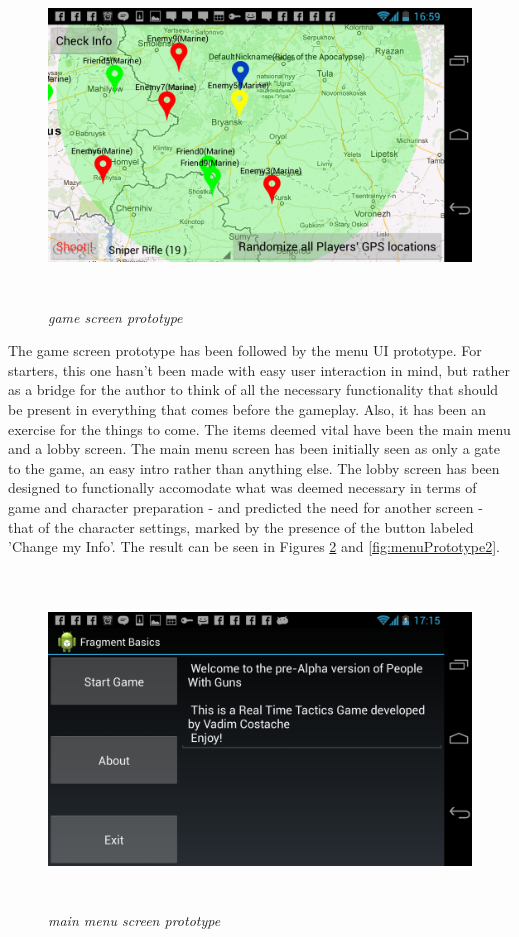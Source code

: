 \begin{figure}
\includegraphics[height=3.5in,width=6.23in]{./images/android_screenshots/ui_prototype/UI_prototype_5.png}  
\caption{\small \sl game screen prototype \label{fig:UIPrototype5}}
\end{figure}


The game screen prototype has been followed by the menu UI prototype. For
starters, this one hasn't been made with easy user interaction in mind, but
rather as a bridge for the author to think of all the necessary functionality
that should be present in everything that comes before the gameplay. Also, it
has been an exercise for the things to come. The items deemed vital have been
the main menu and a lobby screen. The main menu screen has been initially seen
as only a gate to the game, an easy intro rather than anything else. The lobby
screen has been designed to functionally accomodate what was deemed necessary in
terms of game and character preparation - and predicted the need for another
screen - that of the character settings, marked by the presence of the button
labeled 'Change my Info'. The result can be seen in Figures
\ref{fig:menuPrototype1} and \ref{fig:menuPrototype2}.

\begin{figure}
\includegraphics[height=3.5in,width=6.23in]{./images/android_screenshots/menu_prototype/MENU_prototype_1.png}  
\caption{\small \sl main menu screen prototype \label{fig:menuPrototype1}}
\end{figure}

